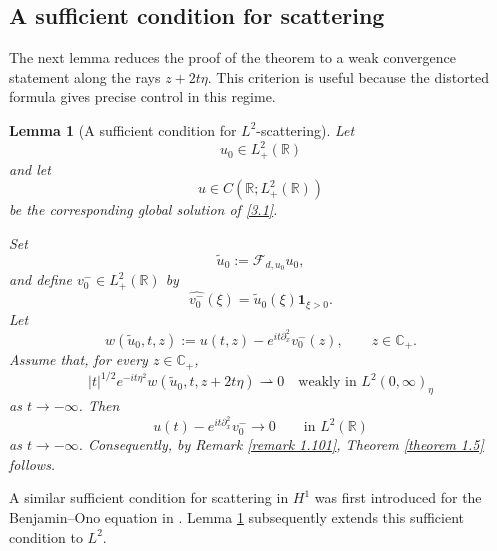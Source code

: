 \documentclass[10pt]{article}
\newtheorem{lemma}[theorem]{Lemma}
\numberwithin{equation}{section}
\numberwithin{theorem}{section}
\begin{document}
\subsection{A sufficient condition for scattering}
The next lemma reduces the proof of the theorem to a weak convergence statement along
the rays \(z+2t\eta\). This criterion is useful because the distorted formula gives precise control in this regime.
\begin{lemma}[A sufficient condition for \(L^2\)-scattering]
\label{lemma 2.29}
Let
\[
u_0\in L_+^{2}(\mathbb R)
\]
and let
\[
u\in C(\mathbb R;L_+^2(\mathbb R))
\]
be the corresponding global solution of \eqref{3.1}. 

Set
\[
\widetilde u_0:=\mathcal F_{d,u_0}u_0,
\]
and define \(v_0^-\in L_+^2(\mathbb R)\) by
\[
\widehat{v_0^-}(\xi)
=
\widetilde u_0(\xi)\mathbf 1_{\xi>0}.
\]
Let
\[
w(\widetilde{u}_0,t,z)
:=
u(t,z)-e^{it\partial_x^2}v_0^-(z),
\qquad z\in\mathbb C_+.
\]
Assume that, for every
\(z\in\mathbb C_+\),
\begin{equation}
\label{eq:l2-weak-radiation-assumption}
|t|^{1/2}e^{-it\eta^2}
w(\widetilde{u}_0,t,z+2t\eta)
\rightharpoonup0
\quad\text{weakly in }L^2(0,\infty)_\eta
\end{equation}
as \(t\to-\infty\). Then
\[
u(t)-e^{it\partial_x^2}v_0^-
\longrightarrow0
\qquad\text{in }L^2(\mathbb R)
\]
as \(t\to-\infty\). Consequently, by Remark \ref{remark 1.101}, Theorem \ref{theorem 1.5} follows.
\end{lemma}
A similar sufficient condition for scattering in $H^1$ was first introduced for the Benjamin–Ono equation in \cite[Lemma 3.2]{0}. Lemma \ref{lemma 2.29} subsequently extends this sufficient condition to $L^2$.
\end{document}
